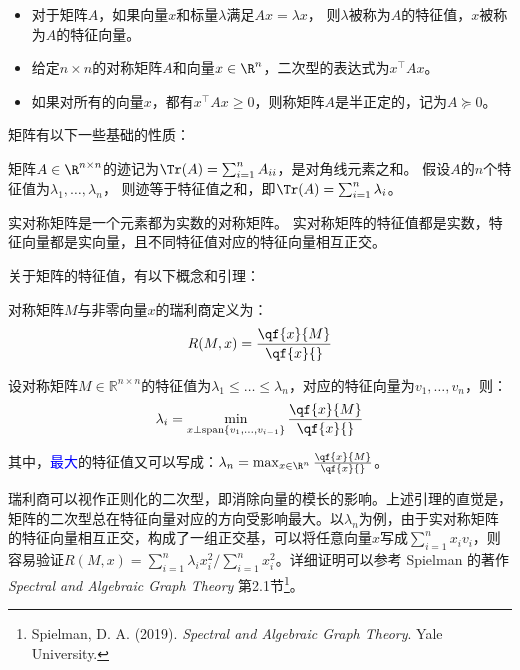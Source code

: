 \documentclass[lang=cn,newtx,10pt,scheme=chinese,chinesefont=nofont,citestyle=gb7714-2015, bibstyle=gb7714-2015]{elegantbook}
\providecommand{\rspace}[1]{\mathbb{R}^{#1}}
\begin{document}
\begin{refsection}
\begin{definition}[矩阵的特征值和二次型]
    \quad
    
    \begin{itemize}
        \item 对于矩阵$A$，如果向量$x$和标量$\lambda$满足$Ax=\lambda x$，
        则$\lambda$被称为$A$的特征值，$x$被称为$A$的特征向量。

        \item 给定$n\times n$的对称矩阵$A$和向量$x\in\R^n$，二次型的表达式为$x^\top Ax$。

        \item 如果对所有的向量$x$，都有$x^\top Ax\ge0$，则称矩阵$A$是半正定的，记为$A\succeq0$。
    \end{itemize}
\end{definition}

矩阵有以下一些基础的性质：

\begin{fact}\label{fact:trace}
    矩阵$A\in\R^{n\times n}$的迹记为$\Tr(A)=\sum_{i=1}^n A_{ii}$，是对角线元素之和。
    假设$A$的$n$个特征值为$\lambda_1,\dots,\lambda_n$，
    则迹等于特征值之和，即$\Tr(A)=\sum_{i=1}^n \lambda_i$。
\end{fact}

\begin{theorem}[谱定理]\label{thm:spectral-thm}
    实对称矩阵是一个元素都为实数的对称矩阵。
    实对称矩阵的特征值都是实数，特征向量都是实向量，且不同特征值对应的特征向量相互正交。
\end{theorem}

关于矩阵的特征值，有以下概念和引理：

\begin{definition}
    对称矩阵$M$与非零向量$x$的瑞利商定义为：
    \[R(M,x)=\frac{\qf{x}{M}}{\qf{x}{}}\]
\end{definition}

\begin{lemma}
\label{lem:rayleigh}
    设对称矩阵$M\in\rspace{n\times n}$的特征值为$\lambda_1\leq\dots\leq\lambda_n$，对应的特征向量为$v_1,\dots,v_n$，则：
    \[\lambda_i=\min_{x\perp\mathrm{span}\{v_{1},\dots,v_{i-1}\}}\frac{\qf{x}{M}}{\qf{x}{}}\]

    其中，\textcolor{blue}{最大}的特征值又可以写成：$\lambda_n=\max_{x\in\R^n}\frac{\qf{x}{M}}{\qf{x}{}}$。
\end{lemma}

瑞利商可以视作正则化的二次型，即消除向量的模长的影响。上述引理的直觉是，矩阵的二次型总在特征向量对应的方向受影响最大。以$\lambda_n$为例，由于实对称矩阵的特征向量相互正交，构成了一组正交基，可以将任意向量$x$写成$\sum_{i=1}^nx_iv_i$，则容易验证$R(M,x)=\sum_{i=1}^n\lambda_ix_i^2/\sum_{i=1}^nx_i^2$。详细证明可以参考 Spielman 的著作 \textit{Spectral and Algebraic Graph Theory} 第2.1节\footnote{Spielman, D. A. (2019). \textit{Spectral and Algebraic Graph Theory}. Yale University.}。


\end{refsection}
\end{document}

